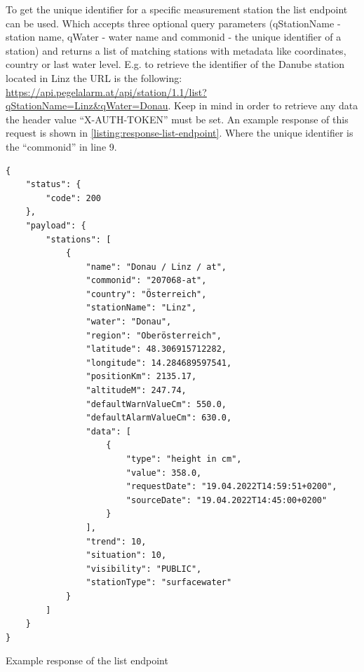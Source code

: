 To get the unique identifier for a specific measurement station the list endpoint can be used. Which accepts three optional query parameters (qStationName - station name, qWater - water name and commonid - the unique identifier of a station) and returns a list of matching stations with metadata like coordinates, country or last water level. E.g. to retrieve the identifier of the Danube station located in Linz the URL is the following: \url{https://api.pegelalarm.at/api/station/1.1/list?qStationName=Linz&qWater=Donau}. Keep in mind in order to retrieve any data the header value ``X-AUTH-TOKEN'' must be set. An example response of this request is shown in \autoref{listing:response-list-endpoint}. Where the unique identifier is the ``commonid'' in line 9.
\begin{listing}
\begin{verbatim}
{
    "status": {
        "code": 200
    },
    "payload": {
        "stations": [
            {
                "name": "Donau / Linz / at",
                "commonid": "207068-at",
                "country": "Österreich",
                "stationName": "Linz",
                "water": "Donau",
                "region": "Oberösterreich",
                "latitude": 48.306915712282,
                "longitude": 14.284689597541,
                "positionKm": 2135.17,
                "altitudeM": 247.74,
                "defaultWarnValueCm": 550.0,
                "defaultAlarmValueCm": 630.0,
                "data": [
                    {
                        "type": "height in cm",
                        "value": 358.0,
                        "requestDate": "19.04.2022T14:59:51+0200",
                        "sourceDate": "19.04.2022T14:45:00+0200"
                    }
                ],
                "trend": 10,
                "situation": 10,
                "visibility": "PUBLIC",
                "stationType": "surfacewater"
            }
        ]
    }
}
\end{verbatim}
\caption{Example response of the list endpoint}
\label{listing:response-list-endpoint}
\end{listing}

